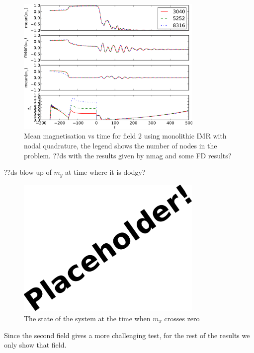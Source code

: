 \begin{figure}
  \centering
  \includegraphics[width=0.8\textwidth]{plots/mumag4_convergence/mumag4_field2-meanmxsvs-meanmysvs-meanmzsvs-dtsvstimes.pdf}
  \caption{Mean magnetisation vs time for field 2 using monolithic IMR with nodal quadrature, the legend shows the number of nodes in the problem.
    ??ds with the results given by nmag and some FD results?
  }
  \label{fig:nmag-comparison-mumag4-field2}
\end{figure}

??ds blow up of $m_y$ at time where it is dodgy?


\begin{figure}
  \centering
  \includegraphics[width=0.8\textwidth]{images/placeholder}
  \caption{The state of the system at the time when $m_x$ crosses zero}
  \label{fig:mumag4-spatial-x-crossing-0}
\end{figure}



Since the second field gives a more challenging test, for the rest of the results we only show that field.

